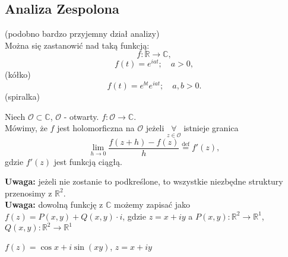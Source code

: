 \documentclass[../main.tex]{subfiles}
\begin{document}
\subsection{Analiza Zespolona}
(podobno bardzo przyjemny dział analizy)\\

Można się zastanowić nad taką funkcją:
\[
f : \mathbb{R}\to \mathbb{C}
,\]
\[
    f(t) = e^{iat};\quad a > 0
,\]
(kółko)
\[
    f(t) = e^{bt}e^{iat};\quad a, b > 0
.\]
(spiralka)
\begin{definicja}
    Niech $\mathcal{O}\subset\mathbb{C}$, $\mathcal{O}$ - otwarty.
    $f : \mathcal{O}\to \mathbb{C}$. \\
    Mówimy, że $f$ jest holomorficzna na $\mathcal{O}$ jeżeli $\underset{z\in \mathcal{O}}{\forall}$ istnieje granica
    \[
        \lim_{h \to 0}\frac{f(z+h) - f(z)}{h} \overset{\text{def}}{=} f'(z)
    ,\]
gdzie $f'(z)$ jest funkcją ciągłą.
\end{definicja}
\textbf{Uwaga:} jeżeli nie zostanie to podkreślone, to wszystkie niezbędne struktury przenosimy z $\mathbb{R}^2$.\\
\textbf{Uwaga:} dowolną funkcję z $\mathbb{C}$ możemy zapisać jako $f(z) = P(x,y) + Q(x,y)\cdot i$, gdzie $z = x + iy$ a $P(x,y): \mathbb{R}^2\to \mathbb{R}^1$, $Q(x,y) : \mathbb{R}^2 \to \mathbb{R}^1$
\begin{przyklad}
    $f(z) = \cos x + i \sin(xy)$, $z = x + iy$
\end{przyklad}
\end{document}
